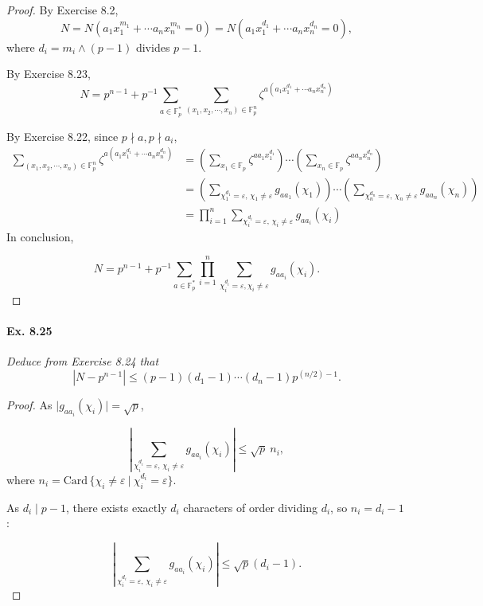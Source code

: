 \documentclass[11pt,a4paper]{article}
\begin{document}
{\begin{proof}
By Exercise 8.2, $$N = N(a_1 x_1^{m_1}+\cdots a_n x_n^{m_n} = 0) = N(a_1 x_1^{d_1}+\cdots a_n x_n^{d_n} = 0),$$where $d_i = m_i \wedge (p-1)$ divides $p-1$.

By Exercise 8.23, 
$$N = p^{n-1}+p^{-1} \sum\limits_{a\in \mathbb{F}_p^*} \sum\limits_{(x_1,x_2,\cdots,x_n) \in \mathbb{F}_p^n} \zeta^{a(a_1 x_1^{d_1}+\cdots a_n x_n^{d_n} )}$$

By Exercise 8.22, since $p \nmid a, p\nmid a_i$,
\begin{align*}
\sum\limits_{(x_1,x_2,\cdots,x_n) \in \mathbb{F}_p^n} \zeta^{a(a_1 x_1^{d_1}+\cdots a_n x_n^{d_n} )} &=\left( \sum\limits_{x_1 \in \mathbb{F}_p} \zeta^{aa_1 x_1^{d_1}}\right)\cdots\left(\sum\limits_{x_n \in \mathbb{F}_p} \zeta^{aa_n x_n^{d_n}}\right)\\
&=\left(\sum\limits_{\chi_1^{d_1} = \varepsilon,\, \chi_1\neq \varepsilon} g_{aa_1}(\chi_1)\right)\cdots\left(\sum\limits_{\chi_n^{d_n}= \varepsilon,\,\chi_n \neq \varepsilon} g_{aa_n}(\chi_n)\right)\\
&=\prod\limits_{i=1}^n \sum\limits_{\chi_i^{d_i}= \varepsilon,\, \chi_i \neq \varepsilon} g_{aa_i}(\chi_i)
\end{align*}
In conclusion,

$$N = p^{n-1}+p^{-1} \sum\limits_{a\in \mathbb{F}_p^*}  \prod\limits_{i=1}^n \sum\limits_{\chi_i^{d_i} = \varepsilon,\chi_i \neq \varepsilon} g_{aa_i}(\chi_i).$$
\end{proof}

\paragraph{Ex. 8.25}

{\it Deduce from Exercise 8.24 that $$|N-p^{n-1}| \leq (p-1)(d_1-1)\cdots(d_n-1)p^{(n/2)-1}.$$
}

\begin{proof}
As $\vert g_{aa_i}(\chi_i)  \vert= \sqrt{p}$,

$$\left\vert\sum\limits_{\chi_i^{d_i} = \varepsilon,\,\chi_i \neq \varepsilon} g_{aa_i}(\chi_i)\right\vert \leq \sqrt{p} \ n_i,$$ where $n_i = \mathrm{Card}\,\{\chi_i \neq \varepsilon \ \vert\  \chi_i^{d_i} = \varepsilon \}$.

As $d_i \mid p-1$, there exists exactly $d_i$ characters of order dividing $d_i$, so $n_i = d_i-1$ :

$$\left | \sum\limits_{\chi_i^{d_i} = \varepsilon,\,\chi_i \neq \varepsilon} g_{aa_i}(\chi_i)\right | \leq \sqrt{p} (d_i-1).$$


\end{proof}}
\end{document}
